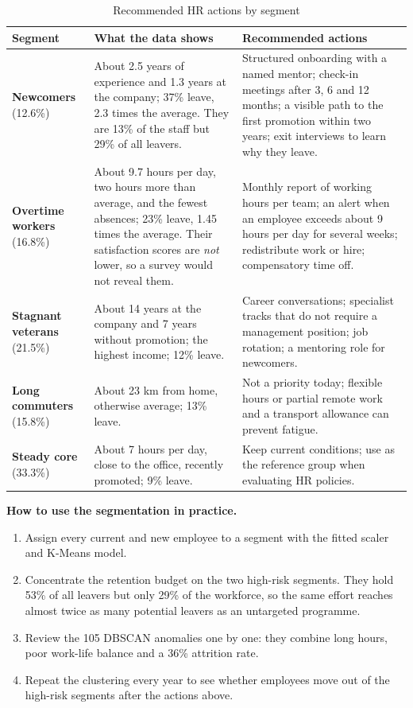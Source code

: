 \documentclass[12pt,a4paper]{article}
\begin{document}
\begin{table}[H]
\centering
\caption{Recommended HR actions by segment}
\label{tab:actions}
\small
\begin{tabularx}{\textwidth}{>{\raggedright\arraybackslash}p{2.4cm}
  >{\raggedright\arraybackslash}X >{\raggedright\arraybackslash}X}
\toprule
\textbf{Segment} & \textbf{What the data shows} & \textbf{Recommended actions}\\
\midrule
\textbf{Newcomers} (12.6\%)
 & About 2.5 years of experience and 1.3 years at the company; 37\% leave,
   2.3 times the average. They are 13\% of the staff but 29\% of all leavers.
 & Structured onboarding with a named mentor; check-in meetings after 3, 6
   and 12 months; a visible path to the first promotion within two years;
   exit interviews to learn why they leave.\\
\addlinespace
\textbf{Overtime workers} (16.8\%)
 & About 9.7 hours per day, two hours more than average, and the fewest
   absences; 23\% leave, 1.45 times the average. Their satisfaction scores
   are \emph{not} lower, so a survey would not reveal them.
 & Monthly report of working hours per team; an alert when an employee
   exceeds about 9 hours per day for several weeks; redistribute work or
   hire; compensatory time off.\\
\addlinespace
\textbf{Stagnant veterans} (21.5\%)
 & About 14 years at the company and 7 years without promotion; the highest
   income; 12\% leave.
 & Career conversations; specialist tracks that do not require a management
   position; job rotation; a mentoring role for newcomers.\\
\addlinespace
\textbf{Long commuters} (15.8\%)
 & About 23 km from home, otherwise average; 13\% leave.
 & Not a priority today; flexible hours or partial remote work and a
   transport allowance can prevent fatigue.\\
\addlinespace
\textbf{Steady core} (33.3\%)
 & About 7 hours per day, close to the office, recently promoted; 9\% leave.
 & Keep current conditions; use as the reference group when evaluating HR
   policies.\\
\bottomrule
\end{tabularx}
\end{table}

\textbf{How to use the segmentation in practice.}
\begin{enumerate}
  \item Assign every current and new employee to a segment with the fitted
  scaler and K-Means model.
  \item Concentrate the retention budget on the two high-risk segments. They
  hold 53\% of all leavers but only 29\% of the workforce, so the same effort
  reaches almost twice as many potential leavers as an untargeted programme.
  \item Review the 105 DBSCAN anomalies one by one: they combine long hours,
  poor work-life balance and a 36\% attrition rate.
  \item Repeat the clustering every year to see whether employees move out
  of the high-risk segments after the actions above.
\end{enumerate}
\end{document}
